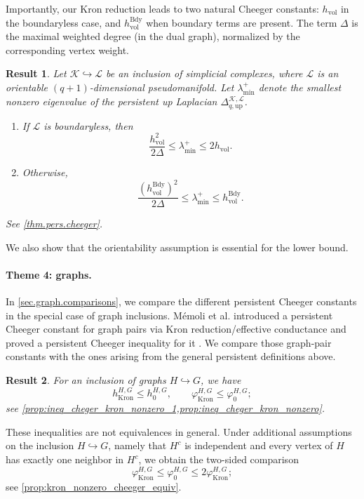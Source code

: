 \documentclass{article}
\newtheorem{resultx}{Result}
\newcommand{\KK}{\mathcal{K}}
\newcommand{\LL}{\mathcal{L}}
\begin{document}
Importantly, our Kron reduction leads to two natural Cheeger constants: \(h_{\mathrm{vol}}\) in the boundaryless case, and \(h_{\mathrm{vol}}^{\mathrm{Bdy}}\) when boundary terms are present. The term $\Delta$ is the maximal weighted degree (in the dual graph), normalized by the corresponding vertex weight.

\begin{resultx}
\label{res:pseudomanifold_cheeger}
Let \(\KK\hookrightarrow \LL\) be an inclusion of simplicial complexes, where \(\LL\) is an orientable \((q+1)\)-dimensional pseudomanifold. Let \(\lambda_{\min}^+\) denote the smallest nonzero eigenvalue of
the persistent up Laplacian \(\Delta_{q,\mathrm{up}}^{\KK,\LL}\). 
\begin{enumerate}
    \item If \(\LL\) is boundaryless, then
    \[
    \frac{h_{\mathrm{vol}}^2}{2\Delta}\leq \lambda_{\min}^+\leq 2h_{\mathrm{vol}}.
    \]
    \item Otherwise,
    \[
    \frac{(h^{\mathrm{Bdy}}_{\mathrm{vol}})^2}{2\Delta}\leq \lambda_{\min}^+\leq h^{\mathrm{Bdy}}_{\mathrm{vol}}.
    \]
\end{enumerate}
See \cref{thm.pers.cheeger}.
\end{resultx}
We also show that the orientability assumption is essential for the lower bound.

\paragraph{Theme 4: graphs.} In \cref{sec.graph.comparisons}, we compare the different persistent Cheeger constants in the special case of graph inclusions. M\'emoli et al. introduced a persistent Cheeger constant for graph pairs via Kron reduction/effective conductance and proved a persistent Cheeger inequality for it \cite[Definition 4.18 and Theorem 4.21]{pers_lap}.
We compare those graph-pair constants with the ones arising from the general persistent definitions above.

\begin{resultx}
\label{res:graph_comparison}
For an inclusion of graphs \(H\hookrightarrow G\), we have
\[
h_{\operatorname{Kron}}^{H,G}\leq h_0^{H,G},
\qquad
\varphi_{\operatorname{Kron}}^{H,G}\leq \varphi_0^{H,G};
\]
see \cref{prop:ineq_cheger_kron_nonzero_1,prop:ineq_cheger_kron_nonzero}.
\end{resultx}

These inequalities are not equivalences in general. Under additional assumptions on the inclusion \(H\hookrightarrow G\), namely that \(H^c\) is independent and every vertex of \(H\) has exactly one neighbor in \(H^c\), we obtain the two-sided comparison
\[
\varphi_{\operatorname{Kron}}^{H,G}
\leq
\varphi_0^{H,G}
\leq
2\varphi_{\operatorname{Kron}}^{H,G};
\]
see \cref{prop:kron_nonzero_cheeger_equiv}.
\end{document}

